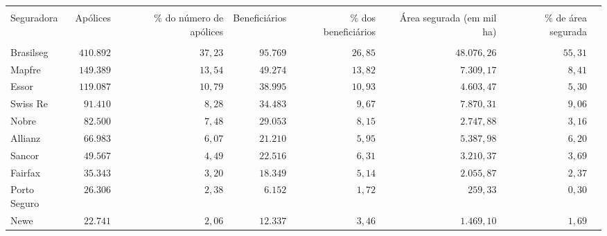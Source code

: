 \footnotesize
\vspace{0.05cm}
\begin{tabularx}{\textwidth}{lRRRRRRR}
    \hline \\[-1.9ex]	 
    Seguradora         & Apólices        & \% do número de apólices  & Beneficiários  & \% dos beneficiários  & Área segurada (em mil ha)  & \% de área segurada   \\
    \hline \\[-1.9ex]	 
    Brasilseg         &  $410.892$      &  $37,23  $                &  $95.769$                    &  $26,85  $            &  $48.076,26$       & $55,31  $              \\
    Mapfre            &  $149.389$      &  $13,54  $                &  $49.274$                    &  $13,82  $            &  $7.309,17$        &  $8,41  $               \\
    Essor             &  $119.087$      &  $10,79  $                &  $38.995$                    &  $10,93  $            &  $4.603,47$        &  $5,30  $               \\
    Swiss Re          &  $91.410$       &  $8,28  $                 &  $34.483$                    &  $9,67  $             &  $7.870,31$        &  $9,06  $               \\
    Nobre             &  $82.500$       &  $7,48  $                 &  $29.053$                    &  $8,15  $             &  $2.747,88$        &  $3,16  $               \\
    Allianz           &  $66.983$       &  $6,07  $                 &  $21.210$                    &  $5,95  $             &  $5.387,98$        &  $6,20  $               \\
    Sancor            &  $49.567$       &  $4,49  $                 &  $22.516$                    &  $6,31  $             &  $3.210,37$        &  $3,69  $               \\
    Fairfax           &  $35.343$       &  $3,20  $                 &  $18.349$                    &  $5,14  $             &  $2.055,87$        &  $2,37  $               \\
    Porto Seguro      &  $26.306$       &  $2,38  $                 &  $6.152$                     &  $1,72  $             &  $259,33$          &  $0,30  $               \\
    Newe              &  $22.741$       &  $2,06  $                 &  $12.337$                    &  $3,46  $             &  $1.469,10$        &  $1,69  $               \\

\end{tabularx}
